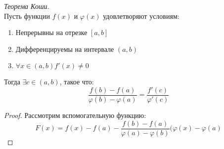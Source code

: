 \begin{theorem}
  \textit{Теорема Коши}. \\
  Пусть функции $f(x)$ и  $\varphi(x)$ удовлетворяют условиям: 
  \begin{enumerate}
    \item Непрерывны на отрезке $[a, b]$
    \item Дифференцируемы на интервале  $(a, b)$ 
    \item  $\forall x \in (a, b) f'(x) \neq 0$
  \end{enumerate}
  Тогда $\exists  c \in (a, b)$, такое что: \[
    \boxed{\frac{f(b) - f(a)}{\varphi(b) - \varphi(a)} = \frac{f'(c)}{\varphi'(c)}}
  \] 
\end{theorem}
\begin{proof}
  Рассмотрим вспомогательную функцию: \[
  F(x) = f(x) - f(a) - \frac{f(b) - f(a)}{\varphi(a) - \varphi(b)}(\varphi(x) - \varphi(a)
  \] 
\end{proof}

